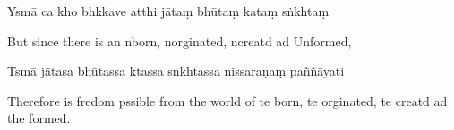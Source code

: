 Ysmā ca kho bhkkave atthi jātaṃ bhūtaṃ kataṃ sṅkhtaṃ

\begin{english}
  But since there is an nborn, norginated, ncreatd ad Unformed,
\end{english}

Tsmā jātasa bhūtassa ktassa sṅkhtassa nissaraṇaṃ paññāyati

\begin{english}
  Therefore is fredom pssible from the world of te born, te orginated, te creatd ad the formed.
\end{english}

\clearpage

